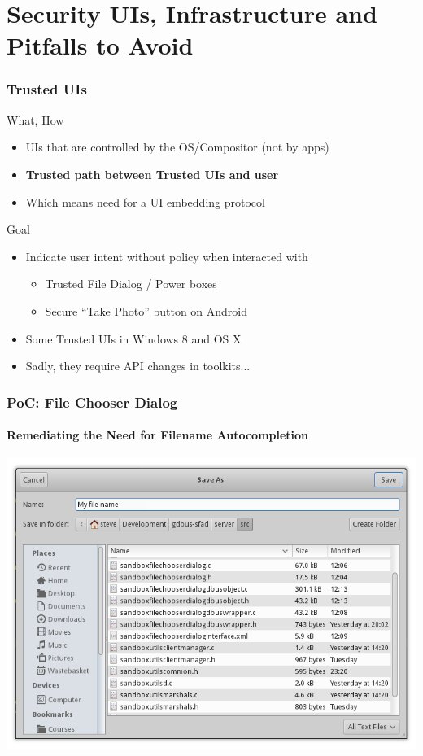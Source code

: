 \section{Security UIs, Infrastructure and Pitfalls to Avoid}

\begin{frame}
\frametitle{ Trusted UIs}

  \begin{block}{What, How}
  \begin{itemize}
  \item UIs that are controlled by the OS/Compositor (not by apps)
  \item \textbf{Trusted path between Trusted UIs and user}
  \item Which means need for a UI embedding protocol
  \end{itemize}
  \end{block}

  \begin{block}{Goal}
  \begin{itemize}
  \item Indicate user intent without policy when interacted with
  {
    \scriptsize
    \begin{itemize}
    \item \scriptsize Trusted File Dialog / Power boxes~\cite{yee_aligning_2004}
    \item \scriptsize Secure ``Take Photo'' button on Android~\cite{roesner_user-driven_2012}
    \end{itemize}
  }
  \item Some Trusted UIs in Windows 8 and OS X
  \item Sadly, they require API changes in toolkits...
  \end{itemize}
  \end{block}

\end{frame}


\begin{frame}
\frametitle{PoC: File Chooser Dialog}
\framesubtitle{Remediating the Need for Filename Autocompletion}
\centering
\vspace{-0.8em}
\includegraphics[height=0.85\textheight]{figures/sfcd-orig.png}
\end{frame}


